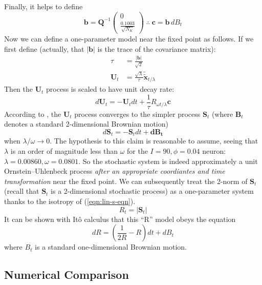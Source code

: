 \documentclass[letterpaper,12pt]{article}
\numberwithin{table}{section}
\numberwithin{figure}{section}
\numberwithin{equation}{section}
\newcommand*{\abs}[1]{\left| #1 \right|}
\newcommand*{\qvec}[2]{\begin{pmatrix} #1 \\ #2 \end{pmatrix}}
\begin{document}
\begin{flushleft}
    Finally, it helps to define
    \begin{equation}
        \mathbf{b} = \mathbf{Q}^{-1} \qvec{0}{\frac{0.1003}{\sqrt{N_K}}} \; \therefore \; \mathbf{c} = \mathbf{b} \, dB_t
    \end{equation}
    Now we can define a one-parameter model near the fixed point as follows. If we first define (actually, that $\abs{\mathbf{b}}$ is the trace of the covariance matrix):
    \begin{align}
        \tau &= \frac{\abs{\mathbf{b}}}{\sqrt{2}} \\
        \mathbf{U}_t &= \frac{\sqrt{\lambda}}{\tau} \tilde{\tilde{\mathbf{x}}}_{t/\lambda}
    \end{align}
    Then the $\mathbf{U}_t$ process is scaled to have unit decay rate:
    \begin{equation}
        d\mathbf{U}_t = -\mathbf{U}_t dt + \frac{1}{\tau} R_{\omega t/\lambda} \mathbf{c}
    \end{equation}
    According to \cite{baxendale}, the $\mathbf{U}_t$ process converges to the simpler process $\mathbf{S}_t$ (where $\mathbf{B}_t$ denotes a standard 2-dimensional Brownian motion)
    \begin{equation}
        d\mathbf{S}_t = -\mathbf{S}_t dt + \mathbf{dB_t}
        \label{eqn:lin-s-eqn}
    \end{equation}
    when $\lambda/\omega \to 0$. The hypothesis to this claim is reasonable to assume, seeing that $\lambda$ is an order of magnitude less than $\omega$ for the $I = 90, \phi = 0.04$ neuron: $\lambda = 0.00860, \omega = 0.0801$. So the stochastic system is indeed approximately a unit Ornstein–Uhlenbeck process \textit{after an appropriate coordiantes and time transformation} near the fixed point. We can subsequently treat the 2-norm of $\mathbf{S}_t$ (recall that $\mathbf{S}_t$ is a 2-dimensional stochastic process) as a one-parameter system thanks to the isotropy of (\ref{eqn:lin-s-eqn}).
    \begin{equation}
        R_t = \abs{\mathbf{S}_t}
    \end{equation}
    It can be shown with It\^o calculus that this ``R'' model obeys the equation
    \begin{equation}
        dR = \left(\frac{1}{2R} - R\right) dt + dB_t
    \end{equation}
    where $B_t$ is a standard one-dimensional Brownian motion.

    \subsection{Numerical Comparison}


\end{flushleft}
\end{document}
